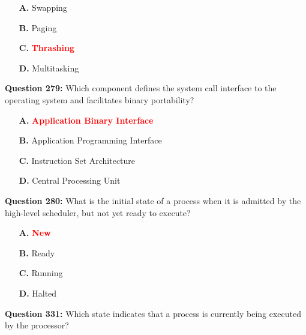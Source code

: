 \documentclass[12pt,a4paper]{article}
\begin{document}
\begin{itemize}
    \item[\textbf{A.}] Swapping
    \item[\textbf{B.}] Paging
    \item[\textbf{C.}] \textcolor{red}{\textbf{Thrashing}}
    \item[\textbf{D.}] Multitasking
\end{itemize}

\vspace{0.5cm}

\vspace{0.5cm}

\vspace{0.5cm}

\vspace{0.5cm}

\textbf{Question 279:} Which component defines the system call interface to the operating system and facilitates binary portability?

\begin{itemize}
    \item[\textbf{A.}] \textcolor{red}{\textbf{Application Binary Interface}}
    \item[\textbf{B.}] Application Programming Interface
    \item[\textbf{C.}] Instruction Set Architecture
    \item[\textbf{D.}] Central Processing Unit
\end{itemize}

\vspace{0.5cm}

\vspace{0.5cm}

\textbf{Question 280:} What is the initial state of a process when it is admitted by the high-level scheduler, but not yet ready to execute?

\begin{itemize}
    \item[\textbf{A.}] \textcolor{red}{\textbf{New}}
    \item[\textbf{B.}] Ready
    \item[\textbf{C.}] Running
    \item[\textbf{D.}] Halted
\end{itemize}

\vspace{0.5cm}

\vspace{0.5cm}

\textbf{Question 331:} Which state indicates that a process is currently being executed by the processor?
\end{document}
